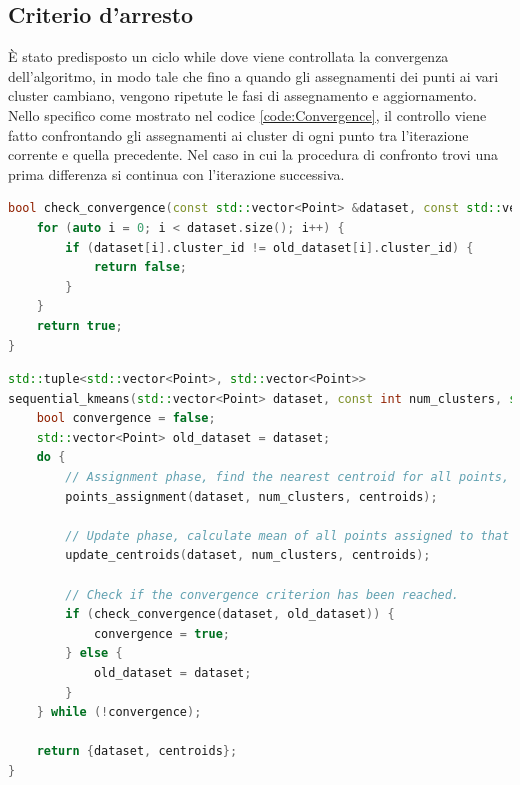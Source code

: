 \documentclass[10pt,twocolumn,letterpaper]{article}
\begin{document}
\subsection{Criterio d'arresto}
È stato predisposto un ciclo while dove viene controllata la convergenza dell'algoritmo, in modo tale che fino a quando gli assegnamenti dei punti ai vari cluster cambiano, vengono ripetute le fasi di assegnamento e aggiornamento. Nello specifico come mostrato nel codice \ref{code:Convergence}, il controllo viene fatto confrontando gli assegnamenti ai cluster di ogni punto tra l'iterazione corrente e quella precedente. Nel caso in cui la procedura di confronto trovi una prima differenza si continua con l'iterazione successiva.
\begin{lstlisting}[language=c++, caption=Controllo convergenza, label=code:Convergence]
bool check_convergence(const std::vector<Point> &dataset, const std::vector<Point> &old_dataset) {
	for (auto i = 0; i < dataset.size(); i++) {
		if (dataset[i].cluster_id != old_dataset[i].cluster_id) {
			return false;
		}
	}
	return true;
}
\end{lstlisting}
\begin{lstlisting}[language=c++, caption=K-Means sequenziale, label=code:sequentialK-Means]
std::tuple<std::vector<Point>, std::vector<Point>>
sequential_kmeans(std::vector<Point> dataset, const int num_clusters, std::vector<Point> centroids) {
	bool convergence = false;
	std::vector<Point> old_dataset = dataset;
	do {
		// Assignment phase, find the nearest centroid for all points, assign the point to that cluster.
		points_assignment(dataset, num_clusters, centroids);
	
		// Update phase, calculate mean of all points assigned to that cluster, for all cluster.
		update_centroids(dataset, num_clusters, centroids);
	
		// Check if the convergence criterion has been reached.
		if (check_convergence(dataset, old_dataset)) {
			convergence = true;
		} else {
			old_dataset = dataset;
		}
	} while (!convergence);
	
	return {dataset, centroids};
}
\end{lstlisting}
\end{document}
